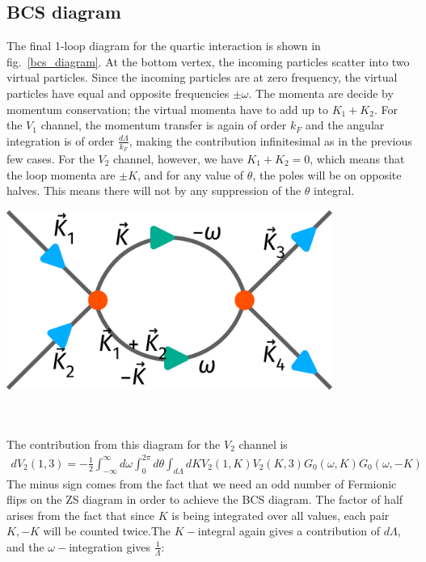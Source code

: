 \documentclass{article}
\begin{document}
\subsection{BCS diagram}
\begin{minipage}{0.55\textwidth}
The final 1-loop diagram for the quartic interaction is shown in fig.~\ref{bcs_diagram}. At the bottom vertex, the incoming particles scatter into two virtual particles. Since the incoming particles are at zero frequency, the virtual particles have equal and opposite frequencies \(\pm \omega\). The momenta are decide by momentum conservation; the virtual momenta have to add up to \(K_1 + K_2\). For the \(V_1\) channel, the momentum transfer is again of order \(k_F\) and the angular integration is of order \(\frac{d\Lambda}{k_F}\), making the contribution infinitesimal as in the previous few cases. For the \(V_2\) channel, however, we have \(K_1 + K_2 = 0\), which means that the loop momenta are \(\pm K\), and for any value of \(\theta\), the poles will be on opposite halves. This means there will not by any suppression of the \(\theta\) integral.
\end{minipage}
\hspace*{\fill}
\begin{minipage}{0.4\textwidth}
	\centering
	\includegraphics[width=0.8\textwidth]{./figures/term6.pdf}
	\label{bcs_diagram}
\end{minipage}
\\\\
The contribution from this diagram for the \(V_2\) channel is
\begin{equation}\begin{aligned}
	dV_2(1,3) = -\frac{1}{2}\int_{-\infty}^\infty d\omega  \int_0^{2\pi} d\theta \int_{d\Lambda}dK V_2(1,K) V_2(K, 3) G_0(\omega, K)G_0(\omega, -K)
\end{aligned}\end{equation}
The minus sign comes from the fact that we need an odd number of Fermionic flips on the ZS diagram in order to achieve the BCS diagram. The factor of half arises from the fact that since \(K\) is being integrated over all values, each pair \(K, -K\) will be counted twice.The \(K-\)integral again gives a contribution of \(d\Lambda\), and the \(\omega-\)integration gives \(\frac{1}{\Lambda}\):
\end{document}
